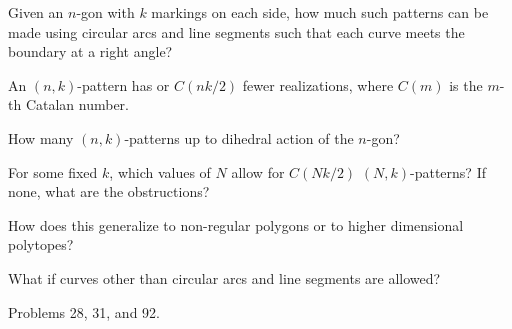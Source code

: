 \documentclass{article}
\begin{document}
\begin{question}
  Given an $n$-gon with $k$ markings on each side, how much such patterns can
  be made using circular arcs and line segments such that each curve meets the
  boundary at a right angle?
\end{question}

\begin{note}
  An $(n,k)$-pattern has or $C(nk/2)$ fewer realizations, where $C(m)$ is the
  $m$-th Catalan number.
\end{note}

\begin{related}
  \item How many $(n,k)$-patterns up to dihedral action of the $n$-gon?
  \item For some fixed $k$, which values of $N$ allow for $C(Nk/2)$ $(N,k)$-patterns?
  If none, what are the obstructions?
  \item How does this generalize to non-regular polygons or to higher dimensional polytopes?
  \item What if curves other than circular arcs and line segments are allowed?
\end{related}

\begin{references}
  \item Problems 28, 31, and 92.
\end{references}
\end{document}
